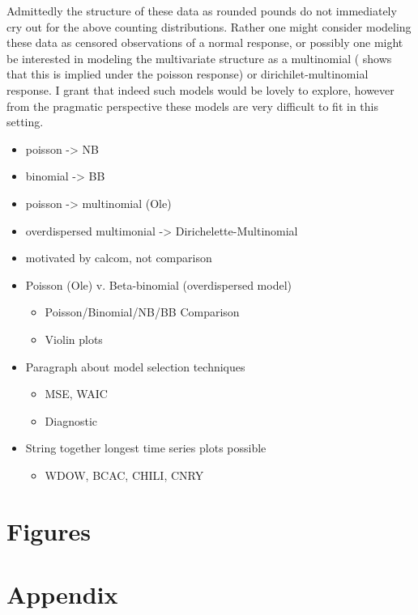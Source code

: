 \documentclass[12pt]{article}
\begin{document}
Admittedly the structure of these data as rounded pounds do not immediately cry 
out for the above counting distributions. Rather one might consider modeling 
these data as censored observations of a normal response, or possibly one might 
be interested in modeling the multivariate structure as a multinomial 
( shows that this is implied under the 
poisson response) or dirichilet-multinomial response. I grant that indeed such 
models would be lovely to explore, however from the pragmatic perspective these 
models are very difficult to fit in this setting. 

\begin{itemize}
	\item poisson -> NB
	\item binomial -> BB
	\item poisson -> multinomial (Ole)
	\item overdispersed multimonial -> Dirichelette-Multinomial
\end{itemize}




%
\begin{itemize}
\item motivated by calcom, not comparison
\item Poisson (Ole) v. Beta-binomial (overdispersed model)
	\begin{itemize}
	\item Poisson/Binomial/NB/BB Comparison
	\item Violin plots
	\end{itemize}
\item Paragraph about model selection techniques
	\begin{itemize}
	\item MSE, WAIC
	\item Diagnostic
	\end{itemize}
\item String together longest time series plots possible
	\begin{itemize}
	\item WDOW, BCAC, CHILI, CNRY
	\end{itemize}
\end{itemize}

%
%
\section{Figures}
%
%

%
%
\section{Appendix}\label{appendix}
%
%
\end{document}
